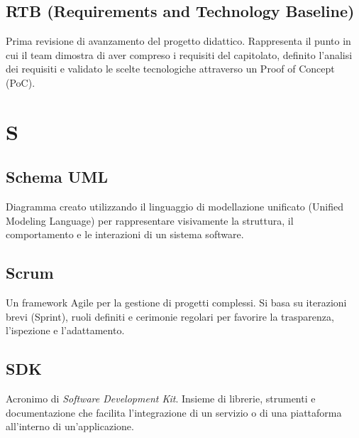 \documentclass[a4paper, 11pt, oneside]{scrartcl} %
\begin{document}
\subsection*{RTB (Requirements and Technology Baseline)}
Prima revisione di avanzamento del progetto didattico. Rappresenta il punto in cui il team dimostra di aver compreso i requisiti del capitolato, definito l'analisi dei requisiti e validato le scelte tecnologiche attraverso un Proof of Concept (PoC).
\vspace{0.5cm}



\section*{S}


\subsection*{Schema UML}


Diagramma creato utilizzando il linguaggio di modellazione unificato (Unified Modeling Language) per rappresentare visivamente la struttura, il comportamento e le interazioni di un sistema software.

\vspace{0.5cm}

\subsection*{Scrum}
Un framework Agile per la gestione di progetti complessi. Si basa su iterazioni brevi (Sprint), ruoli definiti e cerimonie regolari per favorire la trasparenza, l'ispezione e l'adattamento.
\vspace{0.5cm}

\subsection*{SDK}
Acronimo di \textit{Software Development Kit}. Insieme di librerie, strumenti e documentazione che facilita l'integrazione di un servizio o di una piattaforma all'interno di un'applicazione.
\vspace{0.5cm}
\end{document}
